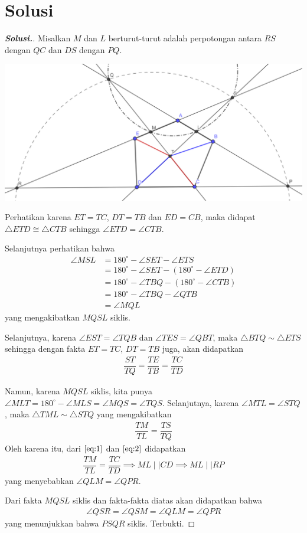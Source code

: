 \documentclass[12pt]{scrartcl}
\begin{document}
\newpage
\section{Solusi}
\begin{proof}[\textbf{Solusi.}]
Misalkan $M$ dan $L$ berturut-turut adalah perpotongan antara $RS$ dengan $QC$ dan $DS$ dengan $PQ$.

\begin{center}
\includegraphics[scale=0.8]{p4.png}
\end{center}
Perhatikan karena $ET=TC$, $DT=TB$ dan $ED=CB$, maka didapat $\triangle ETD \cong \triangle CTB$ sehingga $\angle ETD = \angle CTB$.

Selanjutnya perhatikan bahwa
\begin{align*}
\angle MSL &= 180^\circ - \angle SET - \angle ETS \\
&= 180^\circ - \angle SET -(180^\circ-\angle ETD)\\
&= 180^\circ - \angle TBQ -(180^\circ-\angle CTB)\\
&= 180^\circ - \angle TBQ - \angle QTB\\
&= \angle MQL
\end{align*}
yang mengakibatkan $MQSL$ siklis. 

Selanjutnya, karena $\angle EST = \angle TQB$ dan $\angle TES = \angle QBT$, maka $\triangle BTQ \sim \triangle ETS$ sehingga dengan fakta $ET=TC$, $DT=TB$ juga, akan didapatkan
\begin{align}
\dfrac{ST}{TQ} = \dfrac{TE}{TB} = \dfrac{TC}{TD} \label{eq:1}
\end{align}

Namun, karena $MQSL$ siklis, kita punya $\angle MLT = 180^\circ - \angle MLS = \angle MQS = \angle TQS$. Selanjutnya, karena $\angle MTL = \angle STQ$ , maka $\triangle TML \sim \triangle STQ$ yang mengakibatkan
\begin{align}
\dfrac{TM}{TL} = \dfrac{TS}{TQ} \label{eq:2}
\end{align}
Oleh karena itu, dari $\eqref{eq:1}$ dan $\eqref{eq:2}$ didapatkan
\begin{align*}
\dfrac{TM}{TL} = \dfrac{TC}{TD} \implies ML \mid\mid CD \implies ML \mid\mid RP
\end{align*}
yang menyebabkan $\angle QLM = \angle QPR$.

Dari fakta $MQSL$ siklis dan fakta-fakta diatas akan didapatkan bahwa 
\begin{align*}
\angle QSR = \angle QSM = \angle QLM = \angle QPR
\end{align*}
yang menunjukkan bahwa $PSQR$ siklis. Terbukti.



\end{proof}
\end{document}
